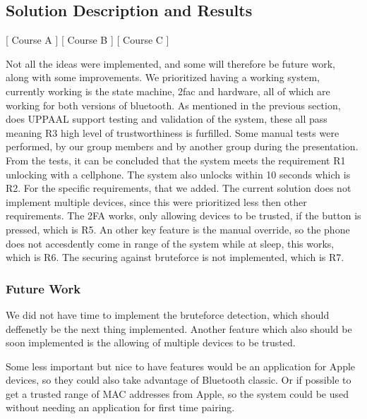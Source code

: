\subsection{Solution Description and Results}
[ Course A ] [ Course B ] [ Course C ] 
\newline
\begin{comment}
The solution provides the functionality of connecting with bluetooth to the ESP, if the bluetooth connection is recognized as a trusted device, it will allow the user to enter. While it is also possible to open up the door with the potentiometer in case that the bluetooth is unable to connect, the idea is that malfunctions could happen and the user would still need access to their house and or belongings. If it were the case that non of the intended methods to gain entry is used, the bluetooth connection and potentiometer, an alarm will be set of as it would then be considered a forced entry.
\end{comment}

Not all the ideas were implemented, and some will therefore be future work, along with some improvements.
We prioritized having a working system, currently working is the state machine, 2fac and hardware, all of which are working for both versions of bluetooth.
As mentioned in the previous section, does UPPAAL support testing and validation of the system, these all pass meaning R3 high level of trustworthiness is furfilled.
Some manual tests were performed, by our group members and by another group during the presentation.
From the tests, it can be concluded that the system meets the requirement R1 unlocking with a cellphone.
The system also unlocks within 10 seconds which is R2.
For the specific requirements, that we added.
The current solution does not implement multiple devices, since this were prioritized less then other requirements.
The 2FA works, only allowing devices to be trusted, if the button is pressed, which is R5.
An other key feature is the manual override, so the phone does not accesdently come in range of the system while at sleep, this works, which is R6.
The securing against bruteforce is not implemented, which is R7.

\subsubsection{Future Work}
We did not have time to implement the bruteforce detection, which should deffenetly be the next thing implemented. Another feature which also should be soon implemented is the allowing of multiple devices to be trusted.

Some less important but nice to have features would be an application for Apple devices, so they could also take advantage of Bluetooth classic.
Or if possible to get a trusted range of MAC addresses from Apple, so the system could be used without needing an application for first time pairing.
